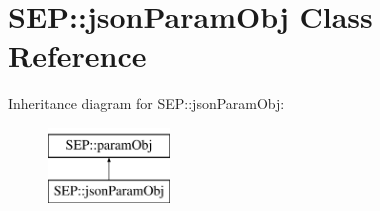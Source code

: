 \hypertarget{class_s_e_p_1_1json_param_obj}{}\section{S\+EP\+:\+:json\+Param\+Obj Class Reference}
\label{class_s_e_p_1_1json_param_obj}
Inheritance diagram for S\+EP\+:\+:json\+Param\+Obj\+:\begin{figure}[H]
\begin{center}
\leavevmode
\includegraphics[height=2.000000cm]{class_s_e_p_1_1json_param_obj}
\end{center}
\end{figure}
